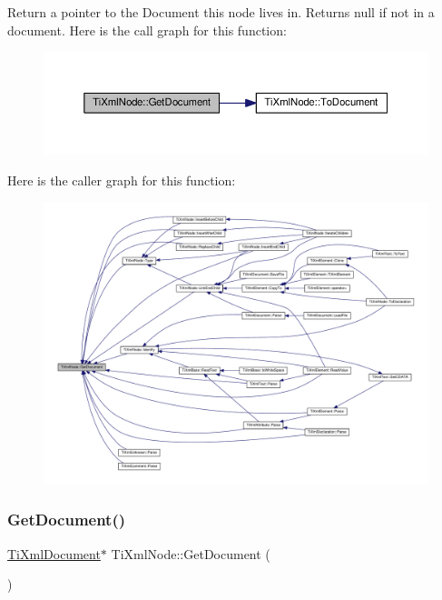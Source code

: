 Return a pointer to the Document this node lives in. Returns null if not in a document. Here is the call graph for this function\+:
\nopagebreak
\begin{figure}[H]
\begin{center}
\leavevmode
\includegraphics[width=350pt]{class_ti_xml_node_adcb070acefcbaedaa0673d82e530538b_cgraph}
\end{center}
\end{figure}
Here is the caller graph for this function\+:
\nopagebreak
\begin{figure}[H]
\begin{center}
\leavevmode
\includegraphics[width=350pt]{class_ti_xml_node_adcb070acefcbaedaa0673d82e530538b_icgraph}
\end{center}
\end{figure}
\mbox{\label{class_ti_xml_node_a7b2372c0e7adfb32f5b6902fe49a39b2}} 
\subsubsection{\texorpdfstring{Get\+Document()}{GetDocument()}\hspace{0.1cm}{\footnotesize\ttfamily [2/2]}}
{\footnotesize\ttfamily \hyperlink{class_ti_xml_document}{Ti\+Xml\+Document}$\ast$ Ti\+Xml\+Node\+::\+Get\+Document (\begin{DoxyParamCaption}{ }\end{DoxyParamCaption})\hspace{0.3cm}{\ttfamily [inline]}}


